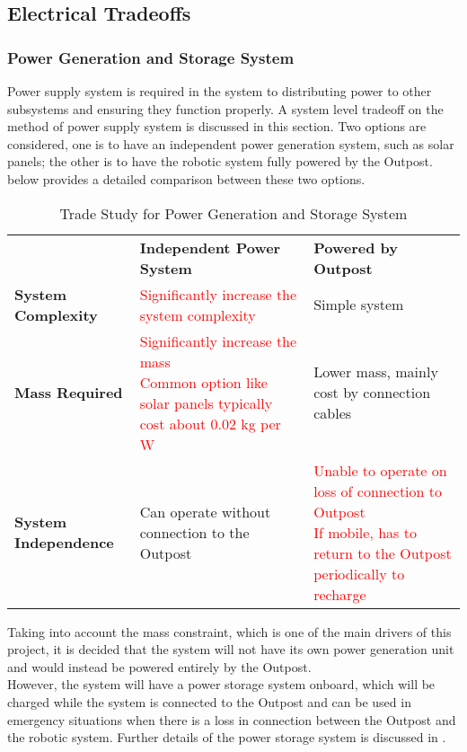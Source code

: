 \subsection{Electrical Tradeoffs}
\subsubsection{Power Generation and Storage System}
Power supply system is required in the system to distributing power to other subsystems and ensuring they function properly. A system level tradeoff on the method of power supply system is discussed in this section. Two options are considered, one is to have an independent power generation system, such as solar panels; the other is to have the robotic system fully powered by the Outpost.  below provides a detailed comparison between these two options.

\begin{table}[H]
\caption{Trade Study for Power Generation and Storage System}
\begin{tabular}{|P{3cm}|P{6.1cm}|P{6.1cm}|}
\hline
	&	\textbf{Independent Power System}	&	\textbf{Powered by Outpost}	\\\hhline{|=|=|=|}
\textbf{System Complexity}	&	\textcolor{red}{Significantly increase the system complexity}	&	\textcolor{OliveGreen}{Simple system}	\\\hline
\textbf{Mass Required}	&	\textcolor{red}{Significantly increase the mass \newline Common option like solar panels typically cost about 0.02 \gls{kg} per \gls{W} \cite{solar_panel}}	&	\textcolor{OliveGreen}{Lower mass, mainly cost by connection cables}	\\\hline
\textbf{System Independence}	&	\textcolor{OliveGreen}{Can operate without connection to the Outpost }	&	\textcolor{red}{Unable to operate  on loss of connection to Outpost \newline If mobile, has to return to the Outpost periodically to recharge}	\\\hline
\end{tabular}
\label{tab:power}
\end{table}

Taking into account the mass constraint, which is one of the main drivers of this project, it is decided that the system will not have its own power generation unit and would instead be powered entirely by the Outpost.\\
However, the system will have a power storage system onboard, which will be charged while the system is connected to the Outpost and can be used in emergency situations when there is a loss in connection between the Outpost and the robotic system. Further details of the power storage system is discussed in .


